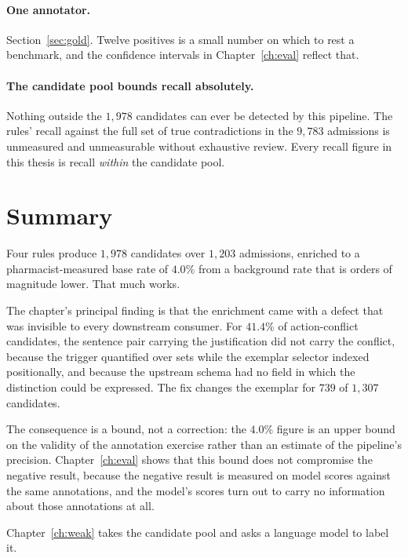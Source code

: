 \paragraph{One annotator.} Section~\ref{sec:gold}. Twelve positives is a small
number on which to rest a benchmark, and the confidence intervals in
Chapter~\ref{ch:eval} reflect that.

\paragraph{The candidate pool bounds recall absolutely.} Nothing outside the
$1{,}978$ candidates can ever be detected by this pipeline. The rules' recall
against the full set of true contradictions in the $9{,}783$ admissions is
unmeasured and unmeasurable without exhaustive review. Every recall figure in
this thesis is recall \emph{within} the candidate pool.

\section{Summary}
\label{sec:cand-summary}

Four rules produce $1{,}978$ candidates over $1{,}203$ admissions, enriched to a
pharmacist-measured base rate of $4.0\%$ from a background rate that is orders
of magnitude lower. That much works.

The chapter's principal finding is that the enrichment came with a defect that
was invisible to every downstream consumer. For $41.4\%$ of action-conflict
candidates, the sentence pair carrying the justification did not carry the
conflict, because the trigger quantified over sets while the exemplar selector
indexed positionally, and because the upstream schema had no field in which the
distinction could be expressed. The fix changes the exemplar for $739$ of
$1{,}307$ candidates.

The consequence is a bound, not a correction: the $4.0\%$ figure is an upper
bound on the validity of the annotation exercise rather than an estimate of the
pipeline's precision. Chapter~\ref{ch:eval} shows that this bound does not
compromise the negative result, because the negative result is measured on
model scores against the same annotations, and the model's scores turn out to
carry no information about those annotations at all.

Chapter~\ref{ch:weak} takes the candidate pool and asks a language model to
label it.
